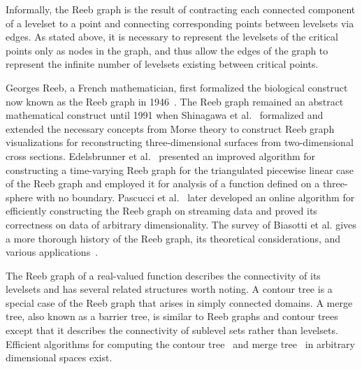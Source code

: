 Informally, the Reeb graph is the result of contracting each connected component of a levelset to a point and connecting corresponding points between levelsets via edges.
%
As stated above, it is necessary to represent the levelsets of the critical points only as nodes in the graph, and thus allow the edges of the graph to represent the infinite number of levelsets existing between critical points.

Georges Reeb, a French mathematician, first formalized the biological construct now known as the Reeb graph in 1946~\cite{Reeb1946}.
%
The Reeb graph remained an abstract mathematical construct until 1991 when Shinagawa et al.~\cite{ShinagawaKuniiKergosien1991} formalized and extended the necessary concepts from Morse theory to construct Reeb graph visualizations for reconstructing three-dimensional surfaces from two-dimensional cross sections.
%
Edelsbrunner et al.~\cite{EdelsbrunnerHarerMascarenhas2008} presented an improved algorithm for constructing a time-varying Reeb graph for the triangulated piecewise linear case of the Reeb graph and employed it for analysis of a function defined on a three-sphere with no boundary.
%
Pascucci et al.~\cite{PascucciScorzelliBremer2007} later developed an online algorithm for efficiently constructing the Reeb graph on streaming data and proved its correctness on data of arbitrary dimensionality.
%
The survey of Biasotti et al. gives a more thorough history of the Reeb graph, its theoretical considerations, and various applications~\cite{BiasottiGiorgiSpagnuolo2008}.


The Reeb graph of a real-valued function describes the connectivity of its levelsets and has several related structures worth noting.
%
A contour tree is a special case of the Reeb graph that arises in simply connected domains.
%
A merge tree, also known as a barrier tree, is similar to Reeb graphs and contour trees except that it describes the connectivity of sublevel sets rather than levelsets.
%
Efficient algorithms for computing the contour tree~\cite{CarrSnoeyinkAxen2003,ChiangLenzLu2005} and merge tree~\cite{OesterlingHeineWeber2015} in arbitrary dimensional spaces exist.

